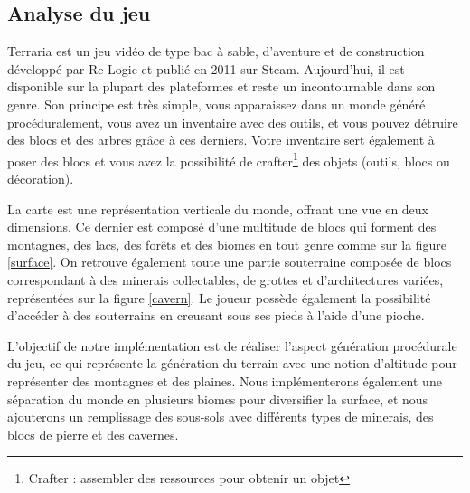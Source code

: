\documentclass[12pt]{article}
\begin{document}
\subsection{Analyse du jeu}

Terraria est un jeu vidéo de type bac à sable, d'aventure et de construction développé par Re-Logic et publié en 2011 sur Steam. Aujourd'hui, il est disponible sur la plupart des plateformes et reste un incontournable dans son genre. Son principe est très simple, vous apparaissez dans un monde généré procéduralement, vous avez un inventaire avec des outils, et vous pouvez détruire des blocs et des arbres grâce à ces derniers. Votre inventaire sert également à poser des blocs et vous avez la possibilité de crafter\footnote{Crafter : assembler des ressources pour obtenir un objet} des objets (outils, blocs ou décoration).\par
La carte est une représentation verticale du monde, offrant une vue en deux dimensions. Ce dernier est composé d'une multitude de blocs qui forment des montagnes, des lacs, des forêts et des biomes en tout genre comme sur la figure \ref{surface}. On retrouve également toute une partie souterraine composée de blocs correspondant à des minerais collectables, de grottes et d'architectures variées, représentées sur la figure \ref{cavern}. Le joueur possède également la possibilité d'accéder à des souterrains en creusant sous ses pieds à l'aide d'une pioche.\par
L'objectif de notre implémentation est de réaliser l'aspect génération procédurale du jeu, ce qui représente la génération du terrain avec une notion d'altitude pour représenter des montagnes et des plaines. Nous implémenterons également une séparation du monde en plusieurs biomes pour diversifier la surface, et nous ajouterons un remplissage des sous-sols avec différents types de minerais, des blocs de pierre et des cavernes.
\vspace{1cm}
\end{document}
